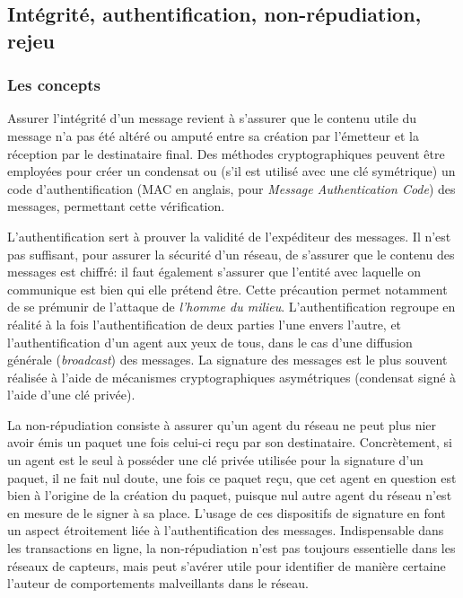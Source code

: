 \subsection{Intégrité, authentification, non-répudiation, rejeu}

    \subsubsection{Les concepts}
Assurer l'intégrité d'un message revient à s'assurer que le contenu utile du message n'a pas été altéré ou amputé entre sa création par l'émetteur et la réception par le destinataire final.
Des méthodes cryptographiques peuvent être employées pour créer un condensat ou (s'il est utilisé avec une clé symétrique) un code d'authentification (MAC en anglais, pour \textit{Message Authentication Code}) des messages, permettant cette vérification.

L'authentification sert à prouver la validité de l'expéditeur des messages.
Il n'est pas suffisant, pour assurer la sécurité d'un réseau, de s'assurer que le contenu des messages est chiffré: il faut également s'assurer que l'entité avec laquelle on communique est bien qui elle prétend être.
Cette précaution permet notamment de se prémunir de l'attaque de \textit{l'homme du milieu}.
L'authentification regroupe en réalité à la fois l'authentification de deux parties l'une envers l'autre, et l'authentification d'un agent aux yeux de tous, dans le cas d'une diffusion générale (\textit{broadcast}) des messages.
La signature des messages est le plus souvent réalisée à l'aide de mécanismes cryptographiques asymétriques (condensat signé à l'aide d'une clé privée).

La non-répudiation consiste à assurer qu'un agent du réseau ne peut plus nier avoir émis un paquet une fois celui-ci reçu par son destinataire.
Concrètement, si un agent est le seul à posséder une clé privée utilisée pour la signature d'un paquet, il ne fait nul doute, une fois ce paquet reçu, que cet agent en question est bien à l'origine de la création du paquet, puisque nul autre agent du réseau n'est en mesure de le signer à sa place.
L'usage de ces dispositifs de signature en font un aspect étroitement liée à l'authentification des messages.
Indispensable dans les transactions en ligne, la non-répudiation n'est pas toujours essentielle dans les réseaux de capteurs, mais peut s'avérer utile pour identifier de manière certaine l'auteur de comportements malveillants dans le réseau.

